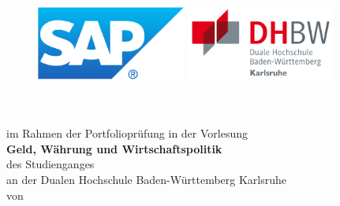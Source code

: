 \thispagestyle{empty}
\begin{titlepage}
\enlargethispage{4cm}

\begin{figure}           %
	\begin{minipage}{0.49\textwidth}
		\flushleft
		\includegraphics[height=2.5cm]{Bilder/Logos/Logo_SAP.pdf} 
	\end{minipage}
	\hfill
	\begin{minipage}{0.49\textwidth}
		\flushright
		\includegraphics[height=2.5cm]{Bilder/Logos/Logo_DHBW.pdf} 
	\end{minipage}
\end{figure} 
\vspace*{2.5cm}

\begin{center}
	\huge{\textbf{\titel}}\\[1.5cm]
	\Large{\textbf{\arbeit}}\\[0.5cm]
	\normalsize{im Rahmen der Portfolioprüfung in der Vorlesung\\[1ex] \textbf{Geld, Währung und Wirtschaftspolitik}}\\[0.5cm]
	\Large{des Studienganges \studiengang}\\[1ex]
	\normalsize{an der Dualen Hochschule Baden-Württemberg Karlsruhe}\\[1cm]
	\normalsize{von}\\[1ex] \Large{\textbf{\autor}} \\[1cm]





\end{center}
\end{titlepage}
